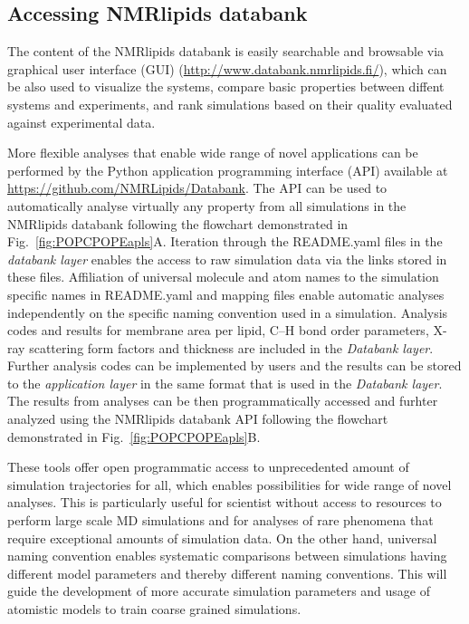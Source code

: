 \documentclass[fleqn,10pt]{wlscirep}
\begin{document}
\subsection{Accessing NMRlipids databank}\label{section:access}
The content of the NMRlipids databank is easily searchable and browsable via graphical user interface (GUI) (\url{http://www.databank.nmrlipids.fi/}), which can be also used to visualize the systems, compare basic properties between diffent systems and experiments, and rank simulations based on their quality evaluated against experimental data. 

More flexible analyses that enable wide range of novel applications can be performed by the Python application programming interface (API) available at \url{https://github.com/NMRLipids/Databank}. The API can be used to automatically analyse virtually any property from all simulations in the NMRlipids databank following the flowchart demonstrated in Fig.~\ref{fig:POPCPOPEapls}A. Iteration through the README.yaml files in the {\it databank layer} enables the access to raw simulation data via the links stored in these files. Affiliation of universal molecule and atom names to the simulation specific names in README.yaml and mapping files enable automatic analyses independently on the specific naming convention used in a simulation. Analysis codes and results for membrane area per lipid, C–H bond order parameters, X-ray scattering form factors and thickness are included in the {\it Databank layer}. Further analysis codes can be implemented by users and the results can be stored to the {\it application layer} in the same format that is used in the {\it Databank layer}. The results from analyses can be then programmatically accessed and furhter analyzed using the NMRlipids databank API following the flowchart demonstrated in Fig.~\ref{fig:POPCPOPEapls}B.

These tools offer open programmatic access to unprecedented amount of simulation trajectories for all, which enables possibilities for wide range of novel analyses. This is particularly useful for scientist without access to resources to perform large scale MD simulations and for analyses of rare phenomena that require exceptional amounts of simulation data. On the other hand, universal naming convention enables systematic comparisons between simulations having different model parameters and thereby different naming conventions. This will guide the development of more accurate simulation parameters and usage of atomistic models to train coarse grained simulations.
\end{document}
